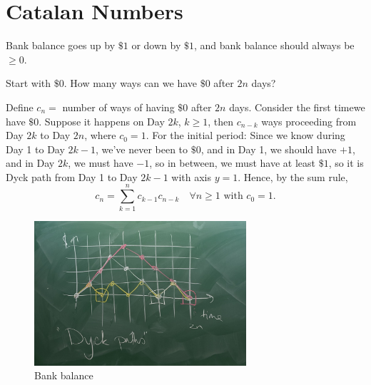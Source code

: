 \section{Catalan Numbers}
\begin{eg}
    Bank balance goes up by \(\$ 1\) or down by \(\$ 1\), and bank balance should always be \(\ge 0\).    
\end{eg}
\begin{question}
    Start with \(\$ 0\). How many ways can we have \(\$ 0\) after \(2n\) days?   
\end{question}
\begin{answer}
    Define \(c_n = \) number of ways of having \(\$ 0\) after \(2n\) days. Consider the first timewe have \(\$ 0\). Suppose it happens on Day \(2k\), \(k \ge 1\), then \(c_{n-k}\) ways proceeding from Day \(2k\) to Day \(2n\), where \(c_0 = 1\). For the initial period: Since we know during Day 1 to Day \(2k - 1\), we've never been to \(\$0\), and in Day 1, we should have \(+1\), and in Day \(2k\), we must have \(-1\), so in between, we must have at least \(\$1\), so it is Dyck path from Day 1 to Day \(2k - 1\) with axis \(y = 1\). Hence, by the sum rule, 
    \[
        c_n = \sum_{k=1}^{n} c_{k-1} c_{n - k} \quad \forall n \ge 1 \text{ with } c_0 = 1.
    \]       
    
    \begin{figure}[H]
        \centering
        \includegraphics[width=0.7\textwidth]{./Figures/IMG_0123.jpg}
        \caption{Bank balance}
        \label{fig:catalan eg 1}
    \end{figure}
\end{answer}